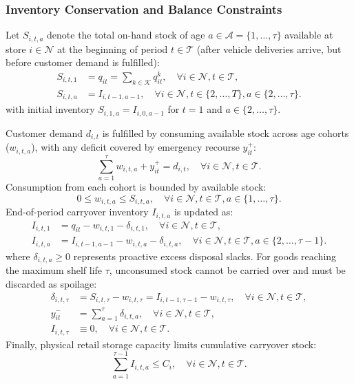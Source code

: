 \documentclass[11pt,a4paper]{article}
\theoremstyle{definition}
\theoremstyle{remark}
\begin{document}
\subsubsection{Inventory Conservation and Balance Constraints}
Let $S_{i,t,a}$ denote the total on-hand stock of age $a \in \mathcal{A} = \{1, \dots, \tau\}$ available at store $i \in \mathcal{N}$ at the beginning of period $t \in \mathcal{T}$ (after vehicle deliveries arrive, but before customer demand is fulfilled):
\begin{align*}
    S_{i,t,1} &= q_{it} = \sum_{k \in \mathcal{K}} q_{it}^k, \quad \forall i \in \mathcal{N}, t \in \mathcal{T}, \\
    S_{i,t,a} &= I_{i,t-1,a-1}, \quad \forall i \in \mathcal{N}, t \in \{2, \dots, T\}, a \in \{2, \dots, \tau\}.
\end{align*}
with initial inventory $S_{i,1,a} = I_{i,0,a-1}$ for $t = 1$ and $a \in \{2, \dots, \tau\}$. 

Customer demand $d_{i,t}$ is fulfilled by consuming available stock across age cohorts ($w_{i,t,a}$), with any deficit covered by emergency recourse $y_{it}^+$:
\begin{equation}
    \sum_{a=1}^\tau w_{i,t,a} + y_{it}^+ = d_{i,t}, \quad \forall i \in \mathcal{N}, t \in \mathcal{T}. \label{eq:demand_satisfaction}
\end{equation}
Consumption from each cohort is bounded by available stock:
\begin{equation*}
    0 \le w_{i,t,a} \le S_{i,t,a}, \quad \forall i \in \mathcal{N}, t \in \mathcal{T}, a \in \{1, \dots, \tau\}.
\end{equation*}
End-of-period carryover inventory $I_{i,t,a}$ is updated as:
\begin{align*}
    I_{i,t,1} &= q_{it} - w_{i,t,1} - \delta_{i,t,1}, \quad \forall i \in \mathcal{N}, t \in \mathcal{T}, \\
    I_{i,t,a} &= I_{i,t-1,a-1} - w_{i,t,a} - \delta_{i,t,a}, \quad \forall i \in \mathcal{N}, t \in \mathcal{T}, a \in \{2, \dots, \tau-1\}.
\end{align*}
where $\delta_{i,t,a} \ge 0$ represents proactive excess disposal slacks. For goods reaching the maximum shelf life $\tau$, unconsumed stock cannot be carried over and must be discarded as spoilage:
\begin{align*}
    \delta_{i,t,\tau} &= S_{i,t,\tau} - w_{i,t,\tau} = I_{i,t-1,\tau-1} - w_{i,t,\tau}, \quad \forall i \in \mathcal{N}, t \in \mathcal{T}, \\
    y_{it}^- &= \sum_{a=1}^\tau \delta_{i,t,a}, \quad \forall i \in \mathcal{N}, t \in \mathcal{T}, \\
    I_{i,t,\tau} &\equiv 0, \quad \forall i \in \mathcal{N}, t \in \mathcal{T}.
\end{align*}
Finally, physical retail storage capacity limits cumulative carryover stock:
\begin{equation}
    \sum_{a=1}^{\tau-1} I_{i,t,a} \le C_i, \quad \forall i \in \mathcal{N}, t \in \mathcal{T}. \label{eq:store_capacity}
\end{equation}
\end{document}
